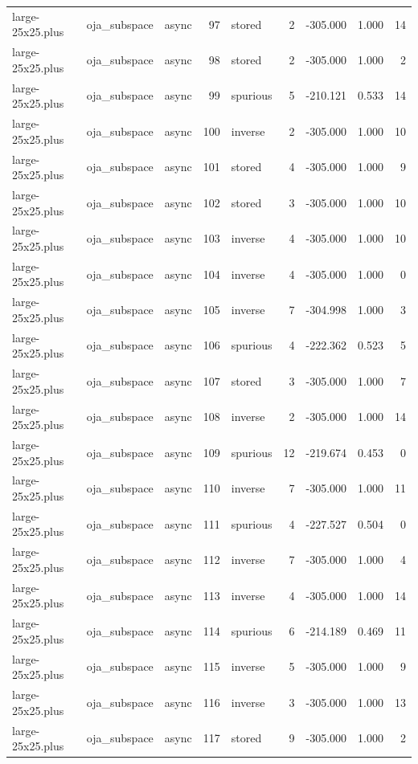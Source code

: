 \begin{tabular}{lllrlrrrr}
large-25x25.plus & oja\_subspace & async & 97 & stored & 2 & -305.000 & 1.000 & 14 \\
large-25x25.plus & oja\_subspace & async & 98 & stored & 2 & -305.000 & 1.000 & 2 \\
large-25x25.plus & oja\_subspace & async & 99 & spurious & 5 & -210.121 & 0.533 & 14 \\
large-25x25.plus & oja\_subspace & async & 100 & inverse & 2 & -305.000 & 1.000 & 10 \\
large-25x25.plus & oja\_subspace & async & 101 & stored & 4 & -305.000 & 1.000 & 9 \\
large-25x25.plus & oja\_subspace & async & 102 & stored & 3 & -305.000 & 1.000 & 10 \\
large-25x25.plus & oja\_subspace & async & 103 & inverse & 4 & -305.000 & 1.000 & 10 \\
large-25x25.plus & oja\_subspace & async & 104 & inverse & 4 & -305.000 & 1.000 & 0 \\
large-25x25.plus & oja\_subspace & async & 105 & inverse & 7 & -304.998 & 1.000 & 3 \\
large-25x25.plus & oja\_subspace & async & 106 & spurious & 4 & -222.362 & 0.523 & 5 \\
large-25x25.plus & oja\_subspace & async & 107 & stored & 3 & -305.000 & 1.000 & 7 \\
large-25x25.plus & oja\_subspace & async & 108 & inverse & 2 & -305.000 & 1.000 & 14 \\
large-25x25.plus & oja\_subspace & async & 109 & spurious & 12 & -219.674 & 0.453 & 0 \\
large-25x25.plus & oja\_subspace & async & 110 & inverse & 7 & -305.000 & 1.000 & 11 \\
large-25x25.plus & oja\_subspace & async & 111 & spurious & 4 & -227.527 & 0.504 & 0 \\
large-25x25.plus & oja\_subspace & async & 112 & inverse & 7 & -305.000 & 1.000 & 4 \\
large-25x25.plus & oja\_subspace & async & 113 & inverse & 4 & -305.000 & 1.000 & 14 \\
large-25x25.plus & oja\_subspace & async & 114 & spurious & 6 & -214.189 & 0.469 & 11 \\
large-25x25.plus & oja\_subspace & async & 115 & inverse & 5 & -305.000 & 1.000 & 9 \\
large-25x25.plus & oja\_subspace & async & 116 & inverse & 3 & -305.000 & 1.000 & 13 \\
large-25x25.plus & oja\_subspace & async & 117 & stored & 9 & -305.000 & 1.000 & 2 \\

\end{tabular}
